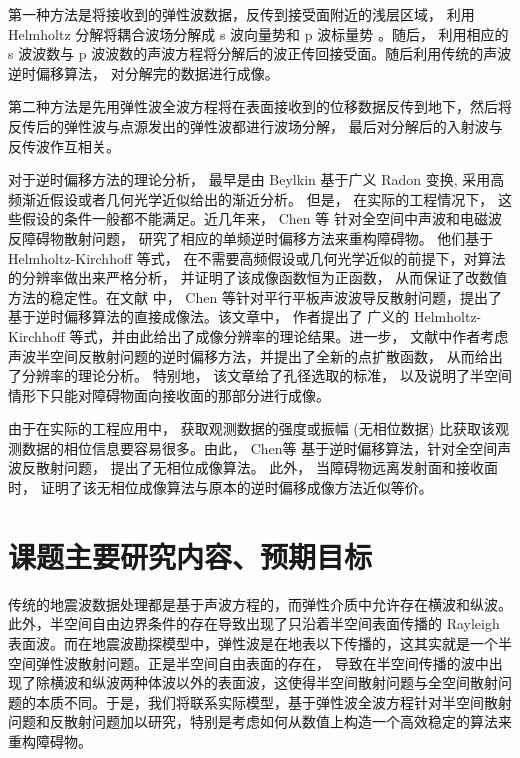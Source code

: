 第一种方法是将接收到的弹性波数据，反传到接受面附近的浅层区域， 利用 Helmholtz 分解将耦合波场分解成 s 波向量势和 p 波标量势 \cite{etgen1988prestacked,zhe1997prestack}。随后， 利用相应的 s 波波数与 p 波波数的声波方程将分解后的波正传回接受面。随后利用传统的声波逆时偏移算法， 对分解完的数据进行成像。

第二种方法是先用弹性波全波方程将在表面接收到的位移数据反传到地下，然后将反传后的弹性波与点源发出的弹性波都进行波场分解， 最后对分解后的入射波与反传波作互相关\cite{dellinger1990wave}。

对于逆时偏移方法的理论分析， 最早是由 Beylkin \cite{beylkin1984inversion,beylkin1985imaging,beylkin1990linearized} 基于广义 Radon 变换, 采用高
频渐近假设或者几何光学近似给出的渐近分析。 但是， 在实际的工程情况下， 这些假设的条件一般都不能满足。近几年来， Chen 等\cite{chen2013reverse_acou,chen2013reverse_elec,thesis_guanghui} 针对全空间中声波和电磁波反障碍物散射问题， 研究了相应的单频逆时偏移方法来重构障碍物。 他们基于  Helmholtz-Kirchhoff 等式， 在不需要高频假设或几何光学近似的前提下，对算法的分辨率做出来严格分析， 并证明了该成像函数恒为正函数， 从而保证了改数值方法的稳定性。在文献 \cite{chen2015reverse_planar} 中， Chen 等针对平行平板声波波导反散射问题，提出了基于逆时偏移算法的直接成像法。该文章中， 作者提出了 广义的 Helmholtz-Kirchhoff 等式，并由此给出了成像分辨率的理论结果。进一步， 文献\cite{RTMhalf_aco}中作者考虑声波半空间反散射问题的逆时偏移方法，并提出了全新的点扩散函数， 从而给出了分辨率的理论分析。 特别地， 该文章给了孔径选取的标准， 以及说明了半空间情形下只能对障碍物面向接收面的那部分进行成像。

由于在实际的工程应用中， 获取观测数据的强度或振幅 (无相位数据) 比获取该观测数据的相位信息要容易很多。由此， Chen等 \cite{chen2016direct} 基于逆时偏移算法，针对全空间声波反散射问题， 提出了无相位成像算法。 此外， 当障碍物远离发射面和接收面时， 证明了该无相位成像算法与原本的逆时偏移成像方法近似等价。



\section{课题主要研究内容、预期目标}
 传统的地震波数据处理都是基于声波方程的，而弹性介质中允许存在横波和纵波。此外，半空间自由边界条件的存在导致出现了只沿着半空间表面传播的 Rayleigh 表面波。而在地震波勘探模型中，弹性波是在地表以下传播的，这其实就是一个半空间弹性波散射问题。正是半空间自由表面的存在， 导致在半空间传播的波中出现了除横波和纵波两种体波以外的表面波，这使得半空间散射问题与全空间散射问题的本质不同。于是，我们将联系实际模型，基于弹性波全波方程针对半空间散射问题和反散射问题加以研究，特别是考虑如何从数值上构造一个高效稳定的算法来重构障碍物。


